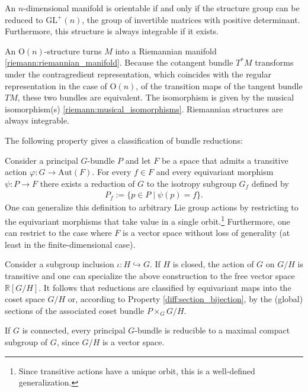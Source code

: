     \begin{example}\label{diff:orientable_structure}
        An $n$-dimensional manifold is orientable if and only if the structure group can be reduced to $\text{GL}^+(n)$, the group of invertible matrices with positive determinant. Furthermore, this structure is always integrable if it exists.
    \end{example}
    \begin{example}\label{diff:riemannian_G_structure}
        An $\text{O}(n)$-structure turns $M$ into a Riemannian manifold \ref{riemann:riemannian_manifold}. Because the cotangent bundle $T^*M$ transforms under the contragredient representation, which coincides with the regular representation in the case of $\text{O}(n)$, of the transition maps of the tangent bundle $TM$, these two bundles are equivalent. The isomorphism is given by the musical isomorphism(s) \ref{riemann:musical_isomorphisms}. Riemannian structures are always integrable.
    \end{example}

    The following property gives a classification of bundle reductions:
    \begin{property}\label{diff:reduction_classification}
        Consider a principal $G$-bundle $P$ and let $F$ be a space that admits a transitive action $\varphi:G\rightarrow\text{Aut}(F)$. For every $f\in F$ and every equivariant morphism $\psi:P\rightarrow F$ there exists a reduction of $G$ to the isotropy subgroup $G_f$ defined by
        \begin{gather}
            P_f := \{p\in P\mid\psi(p) = f\}.
        \end{gather}
        One can generalize this definition to arbitrary Lie group actions by restricting to the equivariant morphisms that take value in a single orbit.\footnote{Since transitive actions have a unique orbit, this is a well-defined generalization.} Furthermore, one can restrict to the case where $F$ is a vector space without loss of generality (at least in the finite-dimensional case).

        Consider a subgroup inclusion $\iota:H\hookrightarrow G$. If $H$ is closed, the action of $G$ on $G/H$ is transitive and one can specialize the above construction to the free vector space $\mathbb{R}[G/H]$. It follows that reductions are classified by equivariant maps into the coset space $G/H$ or, according to Property \ref{diff:section_bijection}, by the (global) sections of the associated coset bundle $P\times_GG/H$.
    \end{property}
    \begin{result}
        If $G$ is connected, every principal $G$-bundle is reducible to a maximal compact subgroup of $G$, since $G/H$ is a vector space.
    \end{result}

